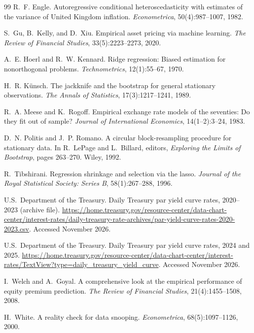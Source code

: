 \documentclass{article}
\begin{document}
{\begin{thebibliography}{99}
R.~F. Engle. Autoregressive conditional heteroscedasticity with estimates of the variance of United Kingdom inflation. \emph{Econometrica}, 50(4):987--1007, 1982.

S.~Gu, B.~Kelly, and D.~Xiu. Empirical asset pricing via machine learning. \emph{The Review of Financial Studies}, 33(5):2223--2273, 2020.

A.~E. Hoerl and R.~W. Kennard. Ridge regression: Biased estimation for nonorthogonal problems. \emph{Technometrics}, 12(1):55--67, 1970.

H.~R. K\"unsch. The jackknife and the bootstrap for general stationary observations. \emph{The Annals of Statistics}, 17(3):1217--1241, 1989.

R.~A. Meese and K.~Rogoff. Empirical exchange rate models of the seventies: Do they fit out of sample? \emph{Journal of International Economics}, 14(1--2):3--24, 1983.

D.~N. Politis and J.~P. Romano. A circular block-resampling procedure for stationary data. In R.~LePage and L.~Billard, editors, \emph{Exploring the Limits of Bootstrap}, pages 263--270. Wiley, 1992.

R.~Tibshirani. Regression shrinkage and selection via the lasso. \emph{Journal of the Royal Statistical Society: Series B}, 58(1):267--288, 1996.

U.S.\ Department of the Treasury. Daily Treasury par yield curve rates, 2020--2023 (archive file). \url{https://home.treasury.gov/resource-center/data-chart-center/interest-rates/daily-treasury-rate-archives/par-yield-curve-rates-2020-2023.csv}. Accessed November 2026.

U.S.\ Department of the Treasury. Daily Treasury par yield curve rates, 2024 and 2025. \url{https://home.treasury.gov/resource-center/data-chart-center/interest-rates/TextView?type=daily_treasury_yield_curve}. Accessed November 2026.

I.~Welch and A.~Goyal. A comprehensive look at the empirical performance of equity premium prediction. \emph{The Review of Financial Studies}, 21(4):1455--1508, 2008.

H.~White. A reality check for data snooping. \emph{Econometrica}, 68(5):1097--1126, 2000.
\end{thebibliography}
}
\end{document}
